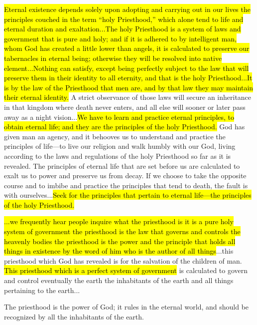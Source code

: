 \begin{compactdesc}
			\item[{\hyperref[EMS-1859-BY-31-JUL-1859]{31 July 1859}}] \hl{Eternal existence depends solely upon adopting and carrying out in our lives the principles couched in the term ``holy Priesthood,'' which alone tend to life and eternal duration and exaltation...The holy Priesthood is a system of laws and government that is pure and holy; and if it is adhered to by intelligent man, whom God has created a little lower than angels, it is calculated to preserve our tabernacles in eternal being; otherwise they will be resolved into native element...Nothing can satisfy, except being perfectly subject to the law that will preserve them in their identity to all eternity, and that is the holy Priesthood...It is by the law of the Priesthood that men are, and by that law they may maintain their eternal identity.} A strict observance of those laws will secure an inheritance in that kingdom where death never enters, and all else will sooner or later pass away as a night vision...\hl{We have to learn and practice eternal principles, to obtain eternal life; and they are the principles of the holy Priesthood.} God has given man an agency, and it behooves us to understand and practice the principles of life---to live our religion and walk humbly with our God, living according to the laws and regulations of the holy Priesthood so far as it is revealed. The principles of eternal life that are set before us are calculated to exalt us to power and preserve us from decay. If we choose to take the opposite course and to imbibe and practice the principles that tend to death, the fault is with ourselves...\hl{Seek for the principles that pertain to eternal life---the principles of the holy Priesthood.}
			\item[{\hyperref[EMS-1864-BY-31-JUL-1864]{31 July 1864}}] \hl{...we frequently hear people inquire what the priesthood is it is a pure holy system of government the priesthood is the law that governs and controls the heavenly bodies the priesthood is the power and the principle that holds all things in existence by the word of him who is the author of all things}...this priesthood which God has revealed is for the salvation of the children of man. \hl{This priesthood which is a perfect system of government} is calculated to govern and control eventually the earth the inhabitants of the earth and all things pertaining to the earth...
			\item[{\hyperref[EMS-1865-BY-6-JUN-1865]{6 June 1865}}] The priesthood is the power of God; it rules in the eternal world, and should be recognized by all the inhabitants of the earth.

\end{compactdesc}
